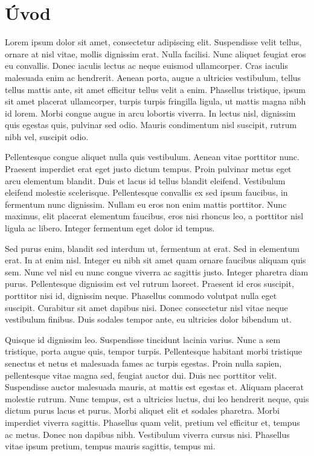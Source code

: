 \chapter*{Úvod} %
Lorem ipsum dolor sit amet, consectetur adipiscing elit. Suspendisse velit tellus, ornare at nisl vitae, mollis dignissim erat. Nulla facilisi. Nunc aliquet feugiat eros eu convallis. Donec iaculis lectus ac neque euismod ullamcorper. Cras iaculis malesuada enim ac hendrerit. Aenean porta, augue a ultricies vestibulum, tellus tellus mattis ante, sit amet efficitur tellus velit a enim. Phasellus tristique, ipsum sit amet placerat ullamcorper, turpis turpis fringilla ligula, ut mattis magna nibh id lorem. Morbi congue augue in arcu lobortis viverra. In lectus nisl, dignissim quis egestas quis, pulvinar sed odio. Mauris condimentum nisl suscipit, rutrum nibh vel, suscipit odio.

Pellentesque congue aliquet nulla quis vestibulum. Aenean vitae porttitor nunc. Praesent imperdiet erat eget justo dictum tempus. Proin pulvinar metus eget arcu elementum blandit. Duis et lacus id tellus blandit eleifend. Vestibulum eleifend molestie scelerisque. Pellentesque convallis ex sed ipsum faucibus, in fermentum nunc dignissim. Nullam eu eros non enim mattis porttitor. Nunc maximus, elit placerat elementum faucibus, eros nisi rhoncus leo, a porttitor nisl ligula ac libero. Integer fermentum eget dolor id tempus.

Sed purus enim, blandit sed interdum ut, fermentum at erat. Sed in elementum erat. In at enim nisl. Integer eu nibh sit amet quam ornare faucibus aliquam quis sem. Nunc vel nisl eu nunc congue viverra ac sagittis justo. Integer pharetra diam purus. Pellentesque dignissim est vel rutrum laoreet. Praesent id eros suscipit, porttitor nisi id, dignissim neque. Phasellus commodo volutpat nulla eget suscipit. Curabitur sit amet dapibus nisi. Donec consectetur nisl vitae neque vestibulum finibus. Duis sodales tempor ante, eu ultricies dolor bibendum ut.

Quisque id dignissim leo. Suspendisse tincidunt lacinia varius. Nunc a sem tristique, porta augue quis, tempor turpis. Pellentesque habitant morbi tristique senectus et netus et malesuada fames ac turpis egestas. Proin nulla sapien, pellentesque vitae magna sed, feugiat auctor dui. Duis nec porttitor velit. Suspendisse auctor malesuada mauris, at mattis est egestas et. Aliquam placerat molestie rutrum. Nunc tempus, est a ultricies luctus, dui leo hendrerit neque, quis dictum purus lacus et purus. Morbi aliquet elit et sodales pharetra. Morbi imperdiet viverra sagittis. Phasellus quam velit, pretium vel efficitur et, tempus ac metus. Donec non dapibus nibh. Vestibulum viverra cursus nisi. Phasellus vitae ipsum pretium, tempus mauris sagittis, tempus mi.

